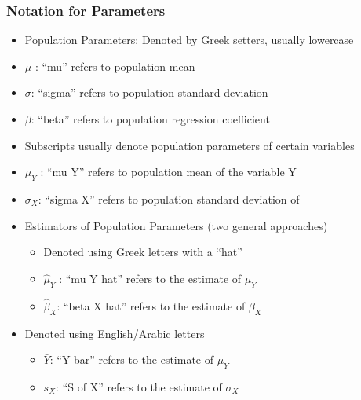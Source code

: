 \begin{frame}
\frametitle{Notation for Parameters}
\begin{itemize}
\item Population Parameters: Denoted by Greek setters, usually lowercase
\item \(\mu\) : ``mu'' refers to population mean
\item \(\sigma\): ``sigma'' refers to population standard deviation
\item \(\beta\): ``beta'' refers to population regression coefficient
\item Subscripts usually denote population parameters of certain variables
\item \(\mu_Y\) : ``mu Y'' refers to population mean of the variable Y
\item \(\sigma_X\): ``sigma X'' refers to population standard deviation of
\item Estimators of Population Parameters (two general approaches)
\begin{itemize}
\item Denoted using Greek letters with a ``hat''
\item \(\hat{\mu}_Y\) : ``mu Y hat'' refers to the estimate of \(\mu_Y\)
\item \(\hat{\beta}_X\): ``beta X hat'' refers to the estimate of
\(\beta_X\)
\end{itemize}
\item Denoted using English/Arabic letters
\begin{itemize}
\item \(\bar{Y}\): ``Y bar'' refers to the estimate of \(\mu_Y\)
\item \(s_X\): ``S of X'' refers to the estimate of \(\sigma_X\)
\end{itemize}
\end{itemize}
\end{frame}

